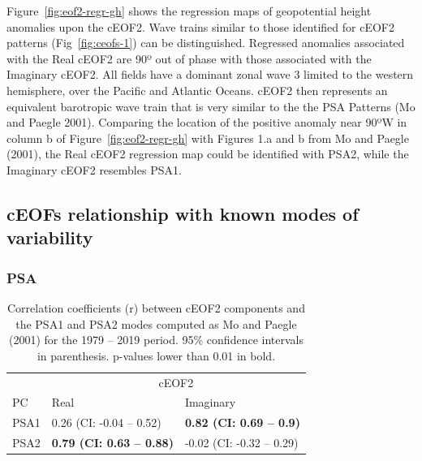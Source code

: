 \documentclass[smallextended]{svjour3}       %
\begin{document}
Figure~\ref{fig:eof2-regr-gh} shows the regression maps of geopotential height anomalies upon the cEOF2.
Wave trains similar to those identified for cEOF2 patterns (Fig~\ref{fig:ceofs-1}) can be distinguished.
Regressed anomalies associated with the Real cEOF2 are 90º out of phase with those associated with the Imaginary cEOF2.
All fields have a dominant zonal wave 3 limited to the western hemisphere, over the Pacific and Atlantic Oceans.
cEOF2 then represents an equivalent barotropic wave train that is very similar to the the PSA Patterns (Mo and Paegle 2001).
Comparing the location of the positive anomaly near 90ºW in column b of Figure~\ref{fig:eof2-regr-gh} with Figures 1.a and b from Mo and Paegle (2001), the Real cEOF2 regression map could be identified with PSA2, while the Imaginary cEOF2 resembles PSA1.

\hypertarget{other-variables}{%
\subsection{cEOFs relationship with known modes of variability}\label{other-variables}}

\hypertarget{psa}{%
\subsubsection{PSA}\label{psa}}



\begin{table}

\caption{\label{tab:psa-eof2}Correlation coefficients (r) between cEOF2 components and the PSA1 and PSA2 modes computed as Mo and Paegle (2001) for the 1979 -- 2019 period. 95\% confidence intervals in parenthesis. p-values lower than 0.01 in bold.}
\centering
\begin{tabular}[t]{l>{}l>{}l}
\toprule
\multicolumn{1}{c}{} & \multicolumn{2}{c}{cEOF2} \\
\cmidrule(l{3pt}r{3pt}){2-3}
PC & Real & Imaginary\\
\midrule
PSA1 & 0.26 (CI: -0.04 -- 0.52) & \textbf{0.82 (CI: 0.69 -- 0.9)}\\
PSA2 & \textbf{0.79 (CI: 0.63 -- 0.88)} & -0.02 (CI: -0.32 -- 0.29)\\
\bottomrule
\end{tabular}
\end{table}
\end{document}
